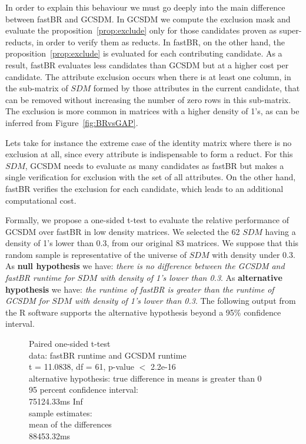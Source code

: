 \documentclass[authoryear,11pt]{elsarticle}
\begin{document}
	In order to explain this behaviour we must go deeply into the main difference between fastBR and GCSDM. 
	In GCSDM we compute the exclusion mask and evaluate the proposition~\ref{prop:exclude} only for those
	candidates proven as super-reducts, in order to verify them as reducts. In fastBR, on the other hand,
	the proposition~\ref{prop:exclude} is evaluated for each contributing candidate. As a result, fastBR
	evaluates less candidates than GCSDM but at a higher cost per candidate. The attribute exclusion
	occurs when there is at least one column, in the sub-matrix of $SDM$ formed by those attributes in the 
	current candidate, that can be removed without increasing the number of zero rows in this sub-matrix.
	The exclusion is more common in matrices with a higher density of 1's, as can be inferred from  
	Figure~\ref{fig:BRvsGAP}. 
	
	Lets take for instance the extreme case of the identity matrix where there is no exclusion at all,
	since every attribute is indispensable to form a reduct. 	For this $SDM$, GCSDM needs to evaluate as 
	many candidates as fastBR but makes a single verification for exclusion with the set of all attributes. 
	On the other hand, fastBR verifies the exclusion for each candidate, which leads to an additional 
	computational cost.
	
	Formally, we propose a one-sided t-test to evaluate the relative performance of GCSDM over fastBR in
	low density matrices. We selected the 62 $SDM$ having a density 	of 1's lower than 0.3, from our original 
	83 matrices. We suppose that this random sample is representative of the universe of $SDM$ with density 
	under 0.3. As \textbf{null hypothesis} we have: \emph{there is no difference between the GCSDM and fastBR 
	runtime for $SDM$ with density of 1's lower than 0.3}. As \textbf{alternative hypothesis} we have: 
	\emph{the runtime of fastBR is greater than the runtime of GCSDM for $SDM$ with density of 1's lower than 
	0.3}. The following output from the R software supports the alternative hypothesis beyond a 95\% confidence
	interval.
	
	\begin{figure}
		\qquad{}	Paired one-sided t-test\\

		data:  fastBR runtime and GCSDM runtime\\
		t = 11.0838, df = 61, p-value $<$ 2.2e-16\\
		alternative hypothesis: true difference in means is greater than 0\\
		95 percent confidence interval:\\
		 75124.33ms  \qquad{}  Inf\\
		sample estimates:\\
		mean of the differences \\
		 \qquad{}    88453.32ms
	\end{figure}
	
\end{document}
